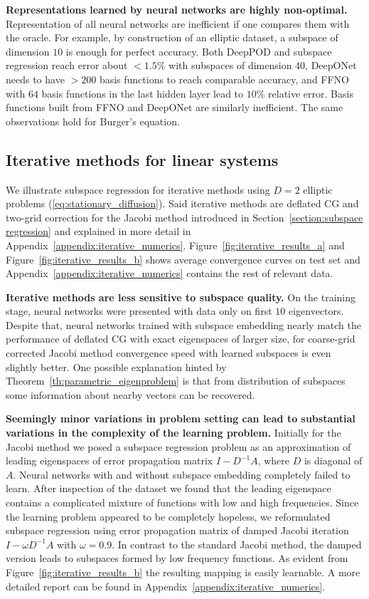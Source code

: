 \documentclass{article}
\begin{document}
\textbf{Representations learned by neural networks are highly non-optimal.} Representation of all neural networks are inefficient if one compares them with the oracle. For example, by construction of an elliptic dataset, a subspace of dimension $10$ is enough for perfect accuracy. Both DeepPOD and subspace regression reach error about $<1.5\%$ with subspaces of dimension $40$, DeepONet needs to have $>200$ basis functions to reach comparable accuracy, and FFNO with $64$ basis functions in the last hidden layer lead to $10\%$ relative error. Basis functions built from FFNO and DeepONet are similarly inefficient. The same observations hold for Burger's equation.

\subsection{Iterative methods for linear systems}
We illustrate subspace regression for iterative methods using $D=2$ elliptic problems (\ref{eq:stationary_diffusion}). Said iterative methods are deflated CG and two-grid correction for the Jacobi method introduced in Section~\ref{section:subspace regression} and explained in more detail in Appendix~\ref{appendix:iterative_numerics}. Figure~\ref{fig:iterative_results_a} and Figure~\ref{fig:iterative_results_b} shows average convergence curves on test set and Appendix~\ref{appendix:iterative_numerics} contains the rest of relevant data.

\textbf{Iterative methods are less sensitive to subspace quality.} On the training stage, neural networks were presented with data only on first $10$ eigenvectors. Despite that, neural networks trained with subspace embedding nearly match the performance of deflated CG with exact eigenspaces of larger size, for coarse-grid corrected Jacobi method convergence speed with learned subspaces is even slightly better. One possible explanation hinted by Theorem~\ref{th:parametric_eigenproblem} is that from distribution of subspaces some information about nearby vectors can be recovered.

\textbf{Seemingly minor variations in problem setting can lead to substantial variations in the complexity of the learning problem.} Initially for the Jacobi method we posed a subspace regression problem as an approximation of leading eigenspaces of error propagation matrix $I - D^{-1} A$, where $D$ is diagonal of $A$. Neural networks with and without subspace embedding completely failed to learn. After inspection of the dataset we found that the leading eigenspace contains a complicated mixture of functions with low and high frequencies. Since the learning problem appeared to be completely hopeless, we reformulated subspace regression using error propagation matrix of damped Jacobi iteration $I - \omega D^{-1} A$ with $\omega = 0.9$. In contrast to the standard Jacobi method, the damped version leads to subspaces formed by low frequency functions. As evident from Figure~\ref{fig:iterative_results_b} the resulting mapping is easily learnable. A more detailed report can be found in Appendix~\ref{appendix:iterative_numerics}.
\end{document}
